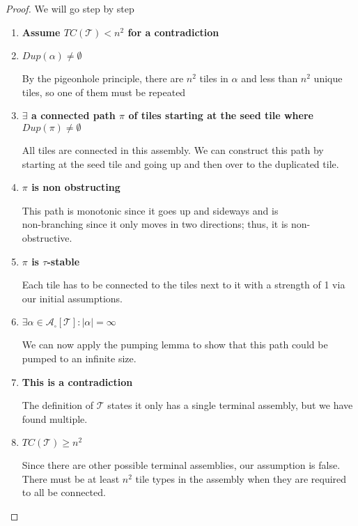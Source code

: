 \documentclass[12pt]{article}
\begin{document}
\begin{proof}
	We will go step by step
	\begin{enumerate}
		\item \textbf{Assume $TC(\mathcal{T}) < n^2$ for a contradiction}

		\item \textbf{$Dup(\alpha) \neq \emptyset$}

		By the pigeonhole principle, there are $n^2$ tiles in $\alpha$ and less than $n^2$ unique tiles, so one of them must be repeated

		\item \textbf{$\exists$ a connected path $\pi$ of tiles starting at the seed tile where $Dup(\pi) \neq \emptyset$}

		All tiles are connected in this assembly. We can construct this path by starting at the seed tile and going up and then over to the duplicated tile. 

		\item \textbf{$\pi$ is non obstructing}
        
            This path is monotonic since it goes up and side\-ways and is \\ non-branching since it only moves in two directions; thus, it is non-obstructive. 
        \item \textbf{$\pi$ is $\tau$-stable}

            Each tile has to be connected to the tiles next to it with a strength of 1 via our initial assumptions.

        \item \textbf{$\exists \alpha \in \mathcal{A}_\square[\mathcal{T}] : |\alpha| = \infty $}

        We can now apply the pumping lemma to show that this path could be pumped to an infinite size.

        \item \textbf{This is a contradiction}

        The definition of $\mathcal{T}$ states it only has a single terminal assembly, but we have found multiple.

		\item \textbf{$TC(\mathcal{T}) \geq n^2$}

            Since there are other possible terminal assemblies, our assumption is false. There must be at least $n^2$ tile types in the assembly when they are required to all be connected. 


	\end{enumerate}
\end{proof}
\end{document}
